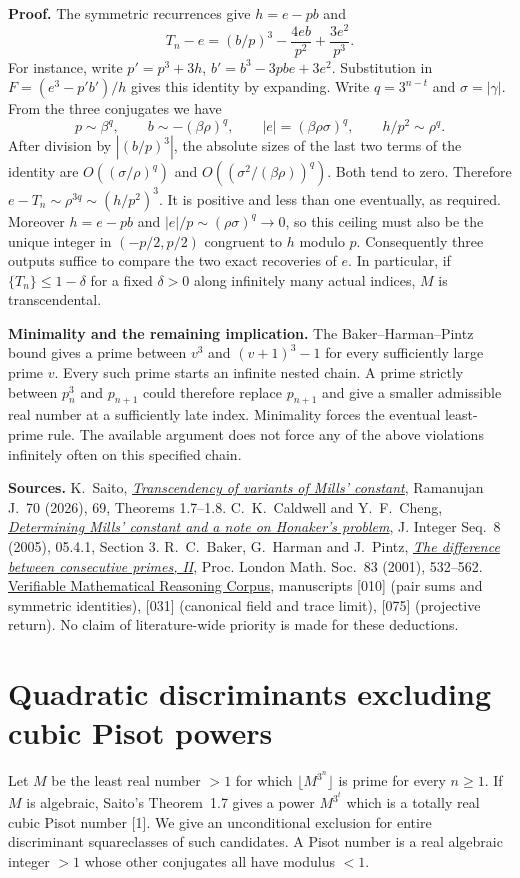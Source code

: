 \documentclass[11pt,a4paper,oneside,openany]{book}
\newcommand{\sub}[1]{\par\medskip\textbf{#1}\enspace}
\begin{document}
\sub{Proof.}
The symmetric recurrences give $h=e-pb$ and
\[
 T_n-e=(b/p)^3-\frac{4eb}{p^2}+\frac{3e^2}{p^3}.
\]
For instance, write $p'=p^3+3h$, $b'=b^3-3pbe+3e^2$. Substitution in $F=(e^3-p'b')/h$ gives this identity by expanding. Write $q=3^{n-t}$ and $\sigma=|\gamma|$. From the three conjugates we have
\[
 p\sim\beta^q,\qquad b\sim-(\beta\rho)^q,\qquad
 |e|=(\beta\rho\sigma)^q,\qquad h/p^2\sim\rho^q .
\]
After division by $|(b/p)^3|$, the absolute sizes of the last two terms of the identity are $O((\sigma/\rho)^q)$ and $O((\sigma^2/(\beta\rho))^q)$. Both tend to zero. Therefore $e-T_n\sim\rho^{3q}\sim(h/p^2)^3$. It is positive and less than one eventually, as required. Moreover $h=e-pb$ and $|e|/p\sim(\rho\sigma)^q\to0$, so this ceiling must also be the unique integer in $(-p/2,p/2)$ congruent to $h$ modulo $p$. Consequently three outputs suffice to compare the two exact recoveries of $e$. In particular, if $\{T_n\}\le1-\delta$ for a fixed $\delta>0$ along infinitely many actual indices, $M$ is transcendental.

\sub{Minimality and the remaining implication.}
The Baker--Harman--Pintz bound gives a prime between $v^3$ and $(v+1)^3-1$ for every sufficiently large prime $v$. Every such prime starts an infinite nested chain. A prime strictly between $p_n^3$ and $p_{n+1}$ could therefore replace $p_{n+1}$ and give a smaller admissible real number at a sufficiently late index. Minimality forces the eventual least-prime rule. The available argument does not force any of the above violations infinitely often on this specified chain.

\sub{Sources.}
K.~Saito, \href{https://doi.org/10.1007/s11139-026-01443-0}{\emph{Transcendency of variants of Mills' constant}}, Ramanujan J.\ 70 (2026), 69, Theorems 1.7--1.8. C.~K.~Caldwell and Y.~F.~Cheng, \href{https://arxiv.org/pdf/1010.4883}{\emph{Determining Mills' constant and a note on Honaker's problem}}, J. Integer Seq.\ 8 (2005), 05.4.1, Section 3. R.~C.~Baker, G.~Harman and J.~Pintz, \href{https://doi.org/10.1112/plms/83.3.532}{\emph{The difference between consecutive primes, II}}, Proc. London Math. Soc.\ 83 (2001), 532--562. \href{https://github.com/QEEDDD/Verifiable-Mathematical-Reasoning-Corpus/tree/8a3f6895d0b9b9f125e43157e4a003a2a2b51704}{Verifiable Mathematical Reasoning Corpus}, manuscripts [010] (pair sums and symmetric identities), [031] (canonical field and trace limit), [075] (projective return). No claim of literature-wide priority is made for these deductions.


\chapter{Quadratic discriminants excluding cubic Pisot powers}\label{ch:res}
Let $M$ be the least real number $>1$ for which $\lfloor M^{3^n}\rfloor$ is prime for every $n\ge1$. If $M$ is algebraic, Saito's Theorem~1.7 gives a power $M^{3^t}$ which is a totally real cubic Pisot number [1]. We give an unconditional exclusion for entire discriminant squareclasses of such candidates. A Pisot number is a real algebraic integer $>1$ whose other conjugates all have modulus $<1$.
\end{document}
